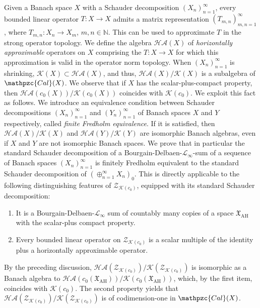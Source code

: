 \documentclass[11pt]{amsart}
\theoremstyle{definition}
\newcommand{\N}{\mathbb{N}}
\numberwithin{equation}{section}
\begin{document}
Given a Banach space $X$ with a Schauder decomposition $(X_n)_{n=1}^\infty$, every bounded linear operator $T:X\to X$ admits a matrix representation $(T_{m,n})_{m,n=1}^\infty$, where $T_{m,n}:X_n\to X_m$, $m,n\in\N$. This can be used to approximate $T$ in the strong operator topology. We define the algebra $\mathcal{HA}(X)$ of {\em horizontally approximable} operators on $X$ comprising the $T:X\to X$ for which this approximation is valid in the operator norm topology. When $(X_n)_{n=1}^\infty$ is shrinking, $\mathcal{K}(X)\subset\mathcal{HA}(X)$, and thus, $\mathcal{HA}(X)/\mathcal{K}(X)$ is a subalgebra of $\mathpzc{Cal}(X)$. We observe that if $X$ has the scalar-plus-compact property, then $\mathcal{HA}(c_0(X))/\mathcal{K}(c_0(X))$ coincides with $\mathcal{K}(c_0)$. We exploit this fact as follows. We introduce an equivalence condition between Schauder decompositions $(X_n)_{n=1}^\infty$ and $(Y_n)_{n=1}^\infty$ of Banach spaces $X$ and $Y$ respectively, called {\em finite Fredholm equivalence}. If it is satisfied, then $\mathcal{HA}(X)/\mathcal{K}(X)$ and $\mathcal{HA}(Y)/\mathcal{K}(Y)$ are isomorphic Banach algebras, even if $X$ and $Y$ are not isomorphic Banach spaces. We prove that in particular the standard Schauder decomposition of a Bourgain-Delbaen-$\mathscr{L}_\infty$-sum of a sequence of Banach spaces $(X_n)_{n=1}^\infty$ is finitely Fredholm equivalent to the standard Schauder decomposition of $(\oplus_{n=1}^\infty X_n)_0$. This is directly applicable to the following distinguishing features of $\mathcal{Z}_{\mathcal{K}(c_0)}$, equipped with its standard Schauder decomposition:
\begin{enumerate}[label=(\roman*),leftmargin=19pt]
    
    \item It is a Bourgain-Delbaen-$\mathscr{L}_\infty$ sum of countably many copies of a space $\mathfrak{X}_\mathrm{AH}$ with the scalar-plus compact property.

    \item Every bounded linear operator on $\mathcal{Z}_{\mathcal{K}(c_0)}$ is a scalar multiple of the identity plus a horizontally approximable operator.
    
\end{enumerate}
By the preceding discussion, $\mathcal{HA}(\mathcal{Z}_{\mathcal{K}(c_0)})/\mathcal{K}(\mathcal{Z}_{\mathcal{K}(c_0)})$ is isomorphic as a Banach algebra to $\mathcal{HA}(c_0(\mathfrak{X}_\mathrm{AH}))/\mathcal{K}(c_0(\mathfrak{X}_\mathrm{AH}))$, which, by the first item, coincides with $\mathcal{K}(c_0)$. The second property yields that $\mathcal{HA}(\mathcal{Z}_{\mathcal{K}(c_0)})/\mathcal{K}(\mathcal{Z}_{\mathcal{K}(c_0)})$ is of codimension-one in $\mathpzc{Cal}(X)$.
\end{document}
